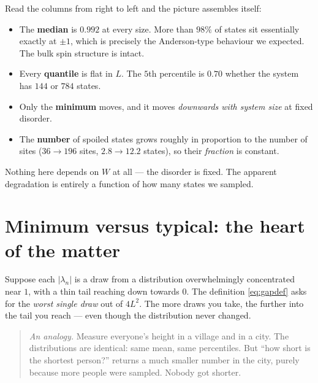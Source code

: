 \documentclass[11pt,a4paper]{article}
\begin{document}
\noindent
Read the columns from right to left and the picture assembles itself:

\begin{itemize}
  \item The \textbf{median} is $0.992$ at every size. More than $98\%$ of
        states sit essentially exactly at $\pm1$, which is precisely the
        Anderson-type behaviour we expected. The bulk spin structure is intact.
  \item Every \textbf{quantile} is flat in $L$. The $5$th percentile is
        $0.70$ whether the system has $144$ or $784$ states.
  \item Only the \textbf{minimum} moves, and it moves \emph{downwards with
        system size} at fixed disorder.
  \item The \textbf{number} of spoiled states grows roughly in proportion to
        the number of sites ($36\to196$ sites, $2.8\to12.2$ states), so their
        \emph{fraction} is constant.
\end{itemize}

\noindent
Nothing here depends on $W$ at all --- the disorder is fixed. The apparent
degradation is entirely a function of how many states we sampled.

\section{Minimum versus typical: the heart of the matter}

Suppose each $|\lambda_n|$ is a draw from a distribution overwhelmingly
concentrated near $1$, with a thin tail reaching down towards $0$. The
definition \eqref{eq:gapdef} asks for the \emph{worst single draw} out of
$4L^2$. The more draws you take, the further into the tail you reach --- even
though the distribution never changed.

\begin{quote}
\emph{An analogy.} Measure everyone's height in a village and in a city. The
distributions are identical: same mean, same percentiles. But ``how short is
the shortest person?'' returns a much smaller number in the city, purely
because more people were sampled. Nobody got shorter.
\end{quote}
\end{document}
